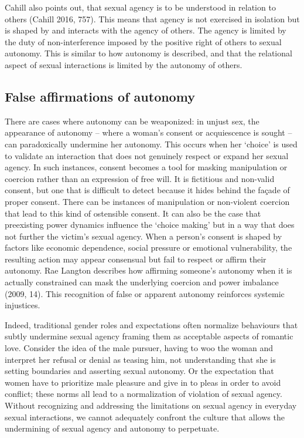 Cahill also points out, that sexual agency is to be understood in
relation to others (Cahill 2016, 757). This means that agency is not
exercised in isolation but is shaped by and interacts with the agency of
others. The agency is limited by the duty of non-interference imposed by
the positive right of others to sexual autonomy. This is similar to how
autonomy is described, and that the relational aspect of sexual
interactions is limited by the autonomy of others.

\subsection*{False affirmations of autonomy}
There are cases where autonomy can be weaponized: in unjust sex, the
appearance of autonomy -- where a woman's consent or acquiescence is
sought -- can paradoxically undermine her autonomy. This occurs when her
`choice' is used to validate an interaction that does not genuinely
respect or expand her sexual agency. In such instances, consent becomes
a tool for masking manipulation or coercion rather than an expression of
free will. It is fictitious and non-valid consent, but one that is
difficult to detect because it hides behind the façade of proper
consent. There can be instances of manipulation or non-violent coercion
that lead to this kind of ostensible consent. It can also be the case
that preexisting power dynamics influence the `choice making' but in a
way that does not further the victim's sexual agency. When a person's
consent is shaped by factors like economic dependence, social pressure
or emotional vulnerability, the resulting action may appear consensual
but fail to respect or affirm their autonomy. Rae Langton describes how
affirming someone's autonomy when it is actually constrained can mask
the underlying coercion and power imbalance (2009, 14). This
recognition of false or apparent autonomy reinforces systemic
injustices.

Indeed, traditional gender roles and expectations often normalize
behaviours that subtly undermine sexual agency framing them as
acceptable aspects of romantic love. Consider the idea of the male
pursuer, having to woo the woman and interpret her refusal or denial as
teasing him, not understanding that she is setting boundaries and
asserting sexual autonomy. Or the expectation that women have to
prioritize male pleasure and give in to pleas in order to avoid
conflict; these norms all lead to a normalization of violation of sexual
agency. Without recognizing and addressing the limitations on sexual
agency in everyday sexual interactions, we cannot adequately confront
the culture that allows the undermining of sexual agency and autonomy to
perpetuate.

